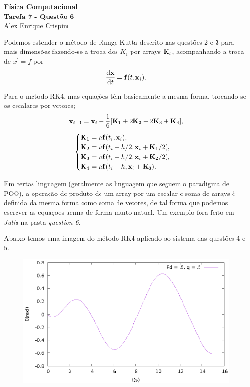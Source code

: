 


  \begin{center}
    \LARGE \textbf{Física Computacional} \\
    \Large \textbf{Tarefa 7 - Questão 6} \\
    \large Alex Enrique Crispim
  \end{center}

  Podemos estender o método de Runge-Kutta descrito nas questões 2 e 3 para mais dimensões fazendo-se a troca dos $K_i$ por arrays $\vb{K}_i$, acompanhando a troca de $x^\prime = f$ por
  \begin{equation*}
    \dv{\vb{x}}{t} = \vb{f}(t, \vb{x}_i).
  \end{equation*}

  Para o método RK4, mas equações têm basicamente a mesma forma, trocando-se os escalares por vetores;
  \begin{equation}
    \vb{x}_{i+1} = \vb{x}_i + \frac{1}{6} \qty[\vb{K}_1 + 2 \vb{K}_2 + 2\vb{K}_3 + \vb{K}_4],
  \end{equation}
  \begin{equation*}
    \begin{cases}
      \vb{K}_1 = h \vb{f}(t_i, \vb{x}_i), \\
      \vb{K}_2 = h \vb{f}(t_i + h/2, \vb{x}_i + \vb{K}_1 / 2), \\
      \vb{K}_3 = h \vb{f}(t_i + h/2, \vb{x}_i + \vb{K}_2 / 2), \\
      \vb{K}_4 = h \vb{f}(t_i + h, \vb{x}_i + \vb{K}_3).
    \end{cases}
  \end{equation*}

  Em certas linguagem (geralmente as linguagem que seguem o paradigma de POO), a operação de produto de um array por um escalar e soma de arrays é definida da mesma forma como soma de vetores, de tal forma que podemos escrever as equações acima de forma muito natual. Um exemplo fora feito em \textit{Julia} na pasta \textit{question 6}.

  Abaixo temos uma imagem do método RK4 aplicado ao sistema das questões 4 e 5.
  \begin{figure}[h]
    \center
    \includegraphics{q6Fig}
  \end{figure}


